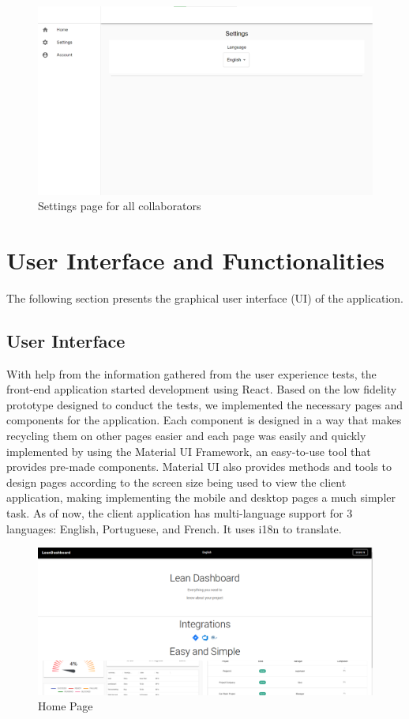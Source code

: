 \documentclass[a4paper,twoside,10pt]{report}
\begin{document}
\begin{figure}[h!]
\center
    \includegraphics[width=\textwidth]{settingsPageForCollaborators.png}
\caption{Settings page for all collaborators}
\end{figure}



\chapter{User Interface and Functionalities}
The following section presents the graphical user interface (UI) of the application.
\section{User Interface}
With help from the information gathered from the user experience tests, the front-end application started development using React.
\newline
Based on the low fidelity prototype designed to conduct the tests, we implemented the necessary pages and components for the application.
\newline
Each component is designed in a way that makes recycling them on other pages easier and each page was easily and quickly implemented by using the Material UI Framework, an easy-to-use tool that provides pre-made components.
Material UI also provides methods and tools to design pages according to the screen size being used to view the client application, making implementing the mobile and desktop pages a much simpler task.
\newline
As of now, the client application has multi-language support for 3 languages: English, Portuguese, and French. It uses i18n to translate.
 
\begin{figure}[h!]
\center
    \includegraphics[width=\textwidth]{HomePage.png}
\caption{Home Page}
\end{figure}
\end{document}
